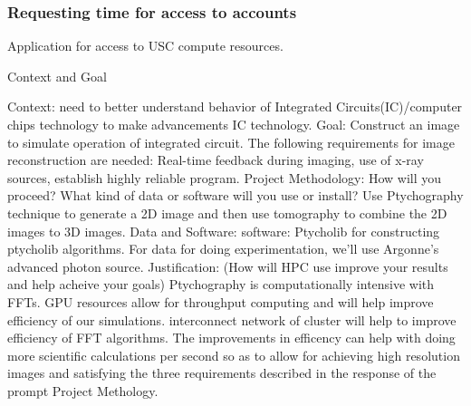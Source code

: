

\begin{frame}
\frametitle{Requesting time for access to accounts}
{\small Application for access to USC compute resources. }
\begin{outline}[enumerate]
\tiny \1 {\tiny Context and Goal} 

\tiny \2 {\tiny Context: need to better understand behavior of
  Integrated Circuits(IC)/computer chips technology to make
  advancements IC technology.} 
\tiny \2 {\tiny Goal: Construct an image to simulate operation of
  integrated circuit. } 
\tiny \3 {\tiny The following requirements for image reconstruction are needed: Real-time feedback during imaging, use of x-ray sources, establish highly reliable program.}
\tiny \1 {\tiny Project Methodology: How will you proceed? What kind of data or software will you use or install?} 
\tiny \2 {\tiny Use Ptychography technique to generate a 2D image and
  then use tomography to combine the 2D images to 3D images.}
\tiny \2 {\tiny Data and Software:}
\tiny \3 {\tiny software: Ptycholib for constructing ptycholib algorithms.}
\tiny \3 {\tiny For data for doing experimentation, we'll use Argonne's advanced photon source.}
\tiny \1 {\tiny Justification: (How will HPC use improve your results and help acheive your goals)}
\tiny \2 {\tiny Ptychography is computationally intensive with FFTs. }
\tiny \2 {\tiny GPU resources allow for throughput computing and will help improve 
efficiency of our simulations.}
\tiny \2 {\tiny interconnect network of cluster will help to improve
  efficiency of FFT algorithms.}
\tiny \2 {\tiny The improvements in efficency can help with doing more
  scientific calculations per second so as to allow for achieving high
  resolution images and satisfying the
  three requirements described in the response of the prompt Project
  Methology.} 
\end{outline} 
\end{frame} 

